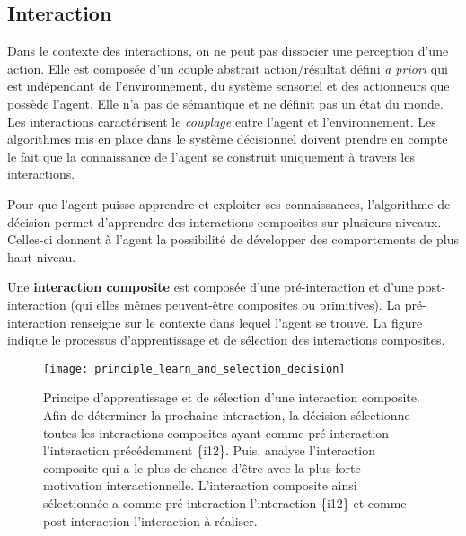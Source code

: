 \documentclass{llncs}
\begin{document}


\subsection{Interaction} \label{par:interaction}
Dans le contexte des interactions,
on ne peut pas dissocier une perception d'une action. Elle est composée d'un couple abstrait action/résultat défini \textit{a priori} qui est indépendant de l'environnement, du système sensoriel et des actionneurs que possède l'agent. Elle n'a pas de sémantique et ne définit pas un état du monde. Les interactions caractérisent le \emph{couplage} entre l'agent et l'environnement. Les algorithmes mis en place dans le système décisionnel doivent prendre en compte le fait que la connaissance de l'agent se construit uniquement à travers les interactions.

Pour que l'agent puisse apprendre et exploiter ses connaissances, l'algorithme de décision permet d'apprendre des interactions composites sur plusieurs niveaux. Celles-ci donnent à l'agent la possibilité de développer des comportements de plus haut niveau.

Une \textbf{interaction composite} est composée d'une pré-interaction et d'une post-interaction (qui elles mêmes peuvent-être composites ou primitives). La pré-interaction renseigne sur le contexte dans lequel l'agent se trouve. La figure  indique le processus d'apprentissage et de sélection des interactions composites.

\begin{figure}
	\centering
	\texttt{[image: principle\_learn\_and\_selection\_decision]}
	\caption{Principe d'apprentissage et de sélection d'une interaction composite. Afin de déterminer la prochaine interaction, la décision sélectionne toutes les interactions composites ayant comme pré-interaction l'interaction précédemment \enacted \{i12\}. Puis, analyse l'interaction composite qui a le plus de chance d'être \enact avec la plus forte motivation interactionnelle. L'interaction composite ainsi sélectionnée a comme pré-interaction l'interaction \enacted \{i12\} et comme post-interaction l'interaction à réaliser.
		}
	\label{fig:decision_learn_and_selection}
\end{figure}
\end{document}

